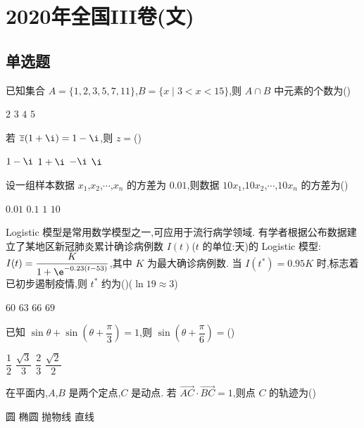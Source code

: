 \chapter{2020年全国III卷(文)}

\section{单选题}

\begin{problem}
已知集合 \(A=\{1,2,3,5,7,11\}\),\(B=\{x\mid 3<x<15\}\),则 \(A\cap B\) 中元素的个数为(\quad)

\choices
    {\(2\)}
    {\(3\)}
    {\(4\)}
    {\(5\)}
\end{problem}

\begin{problem}
若 \(\overline{z}(1+\i)=1-\i\),则 \(z=\)(\quad)

\choices
    {\(1-\i\)}
    {\(1+\i\)}
    {\(-\i\)}
    {\(\i\)}
\end{problem}

\begin{problem}
设一组样本数据 \(x_1\),\(x_2\),\(\cdots\),\(x_n\) 的方差为 \(0.01\),则数据 \(10x_1\),\(10x_2\),\(\cdots\),\(10x_n\) 的方差为(\quad)

\choices
    {\(0.01\)}
    {\(0.1\)}
    {\(1\)}
    {\(10\)}
\end{problem}

\begin{problem}
Logistic 模型是常用数学模型之一,可应用于流行病学领域. 有学者根据公布数据建立了某地区新冠肺炎累计确诊病例数 \(I(t)\)(\(t\) 的单位:天)的 Logistic 模型:\(I(t)=\dfrac{K}{1+\e^{-0.23(t-53)}}\),其中 \(K\) 为最大确诊病例数. 当 \(I(t^*)=0.95K\) 时,标志着已初步遏制疫情,则 \(t^*\) 约为(\quad)(\(\ln 19\approx 3\))

\choices
    {\(60\)}
    {\(63\)}
    {\(66\)}
    {\(69\)}
\end{problem}

\begin{problem}
已知 \(\sin\theta+\sin\left( \theta+\dfrac{\pi}{3} \right)=1\),则 \(\sin\left( \theta+\dfrac{\pi}{6} \right)=\)(\quad)

\choices
    {\(\dfrac{1}{2}\)}
    {\(\dfrac{\sqrt3}{3}\)}
    {\(\dfrac{2}{3}\)}
    {\(\dfrac{\sqrt2}{2}\)}
\end{problem}

\begin{problem}
在平面内,\(A\),\(B\) 是两个定点,\(C\) 是动点. 若 \(\overrightarrow{AC}\cdot\overrightarrow{BC}=1\),则点 \(C\) 的轨迹为(\quad)

\choices
    {圆}
    {椭圆}
    {抛物线}
    {直线}
\end{problem}

